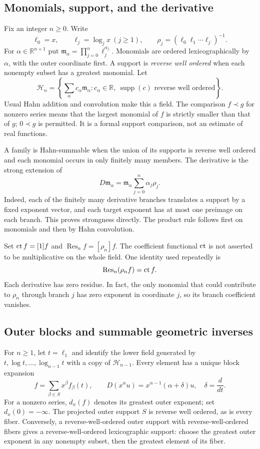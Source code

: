 \documentclass[11pt,a4paper]{article}
\numberwithin{equation}{section}
\theoremstyle{definition}
\theoremstyle{remark}\newtheorem{remark}[theorem]{Remark}
\newcommand{\R}{\mathbb R}\newcommand{\C}{\mathbb C}
\newcommand{\Hh}{\mathcal H}\newcommand{\Ll}{\mathcal L}
\newcommand{\Res}{\operatorname{Res}}\newcommand{\supp}{\operatorname{supp}}
\begin{document}
\subsection{Monomials, support, and the derivative}
Fix an integer $n\ge0$. Write
\[
 \ell_0=x,\qquad \ell_j=\log_jx\ (j\ge1),\qquad
 \rho_j=(\ell_0\ell_1\cdots\ell_j)^{-1}.
\]
For $\alpha\in\R^{n+1}$ put $\mathfrak m_\alpha=\prod_{j=0}^n\ell_j^{\alpha_j}$. Monomials are ordered lexicographically by $\alpha$, with the outer coordinate first. A support is \emph{reverse well ordered} when each nonempty subset has a greatest monomial. Let
\[
 \Hh_n=\left\{\sum_\alpha c_\alpha\mathfrak m_\alpha:
 c_\alpha\in\R,\ \supp(c)\text{ reverse well ordered}\right\}.
\]
Usual Hahn addition and convolution make this a field. The comparison $f\prec g$ for nonzero series means that the largest monomial of $f$ is strictly smaller than that of $g$; $0\prec g$ is permitted. It is a formal support comparison, not an estimate of real functions.

A family is Hahn-summable when the union of its supports is reverse well ordered and each monomial occurs in only finitely many members. The derivative is the strong extension of
\begin{equation}
 D\mathfrak m_\alpha
 =\mathfrak m_\alpha\sum_{j=0}^n\alpha_j\rho_j.
 \label{eq:derivative}
\end{equation}
Indeed, each of the finitely many derivative branches translates a support by a fixed exponent vector, and each target exponent has at most one preimage on each branch. This proves strongness directly. The product rule follows first on monomials and then by Hahn convolution.

Set $\operatorname{ct} f=[1]f$ and $\Res_n f=[\rho_n]f$. The coefficient functional $\operatorname{ct}$ is not asserted to be multiplicative on the whole field. One identity used repeatedly is
\begin{equation}
 \Res_n(\rho_n f)=\ct f.
 \label{eq:rho-ct}
\end{equation}
Each derivative has zero residue. In fact, the only monomial that could contribute to $\rho_n$ through branch $j$ has zero exponent in coordinate $j$, so its branch coefficient vanishes.

\subsection{Outer blocks and summable geometric inverses}
For $n\ge1$, let $t=\ell_1$ and identify the lower field generated by $t,\log t,\ldots,\log_{n-1}t$ with a copy of $\Hh_{n-1}$. Every element has a unique block expansion
\begin{equation}
 f=\sum_{\beta\in S}x^\beta f_\beta(t),\qquad
 D(x^\alpha u)=x^{\alpha-1}(\alpha+\delta)u,
 \quad\delta=\frac{d}{dt}.
 \label{eq:blocks}
\end{equation}
For a nonzero series, $d_x(f)$ denotes its greatest outer exponent; set $d_x(0)=-\infty$. The projected outer support $S$ is reverse well ordered, as is every fiber. Conversely, a reverse-well-ordered outer support with reverse-well-ordered fibers gives a reverse-well-ordered lexicographic support: choose the greatest outer exponent in any nonempty subset, then the greatest element of its fiber.
\end{document}
